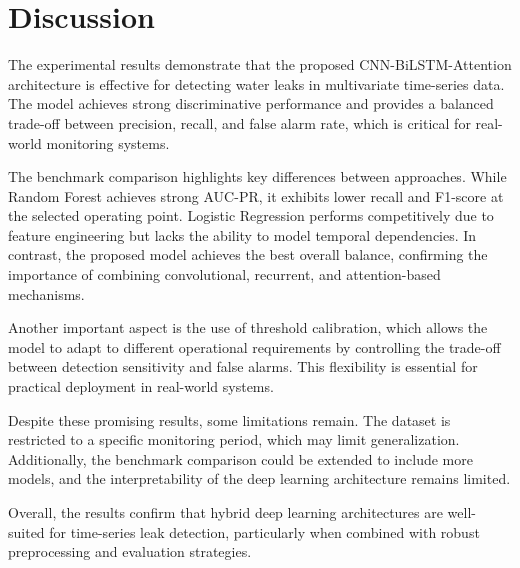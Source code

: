 \section{Discussion}

\noindent The experimental results demonstrate that the proposed CNN-BiLSTM-Attention
architecture is effective for detecting water leaks in multivariate time-series
data. The model achieves strong discriminative performance and provides a
balanced trade-off between precision, recall, and false alarm rate, which is
critical for real-world monitoring systems.

\vspace{0.2cm}

\noindent The benchmark comparison highlights key differences between approaches.
While Random Forest achieves strong AUC-PR, it exhibits lower recall and F1-score
at the selected operating point. Logistic Regression performs competitively due
to feature engineering but lacks the ability to model temporal dependencies.
In contrast, the proposed model achieves the best overall balance, confirming
the importance of combining convolutional, recurrent, and attention-based
mechanisms.

\vspace{0.2cm}

\noindent Another important aspect is the use of threshold calibration, which allows
the model to adapt to different operational requirements by controlling the
trade-off between detection sensitivity and false alarms. This flexibility is
essential for practical deployment in real-world systems.

\vspace{0.2cm}

\noindent Despite these promising results, some limitations remain. The dataset is
restricted to a specific monitoring period, which may limit generalization.
Additionally, the benchmark comparison could be extended to include more models,
and the interpretability of the deep learning architecture remains limited.

\vspace{0.2cm}

\noindent Overall, the results confirm that hybrid deep learning architectures are
well-suited for time-series leak detection, particularly when combined with
robust preprocessing and evaluation strategies.